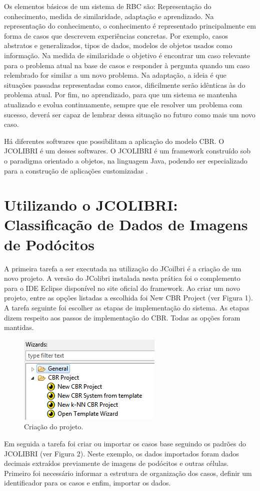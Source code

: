 \documentclass[conference]{IEEEtran}
\begin{document}
Os elementos básicos de um sistema de RBC são: Representação do conhecimento, medida de similaridade, adaptação e aprendizado. Na representação do conhecimento, o conhecimento é representado principalmente em forma de casos que descrevem experiências concretas. Por exemplo, casos abstratos e generalizados, tipos de dados, modelos de objetos usados como informação.  Na medida de similaridade o objetivo é encontrar um caso relevante para o problema atual na base de casos e responder à pergunta quando um caso relembrado for similar a um novo problema. Na adaptação, a ideia é que situações passadas representadas como casos, dificilmente serão idênticas às do problema atual. Por fim, no aprendizado, para que um sistema se mantenha atualizado e evolua continuamente, sempre que ele resolver um problema com sucesso, deverá ser capaz de lembrar dessa situação no futuro como mais um novo caso.

Há diferentes softwares que possibilitam a aplicação do modelo CBR. O JCOLIBRI é um desses softwares. O JCOLIBRI é um framework construído sob o paradigma orientado a objetos, na linguagem Java, podendo ser especializado para a construção de aplicações customizadas \cite{ref3}.

\section{Utilizando o JCOLIBRI: Classificação de Dados de Imagens de Podócitos}
A primeira tarefa a ser executada na utilização do JCoilbri é a criação de um novo projeto. A versão do JColibri instalada nesta prática foi o complemento para o IDE Eclipse disponível no site oficial do framework. Ao criar um novo projeto, entre as opções listadas a escolhida foi New CBR Project (ver Figura 1). A tarefa seguinte foi escolher as etapas de implementação do sistema. As etapas dizem respeito aos passos de implementação do CBR. Todas as opções foram mantidas.

\begin{figure}[htbp]
	\centerline{\includegraphics{fig1.png}}
	\caption{Criação do projeto.}
	\label{fig1}
\end{figure}
Em seguida a tarefa foi criar ou importar os casos base seguindo os padrões do JCOLIBRI (ver Figura 2). Neste exemplo, os dados importados foram dados decimais extraídos previamente de imagens de podócitos e outras células. Primeiro foi necessário informar a estrutura de organização dos casos, definir um identificador para os casos e enfim, importar os dados. 
\end{document}
